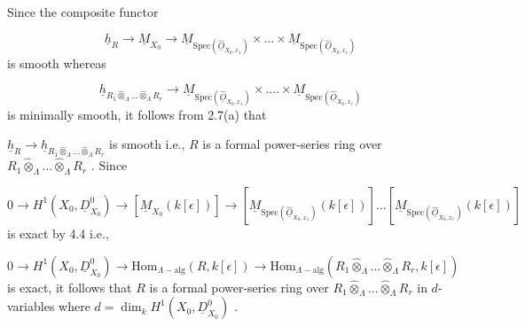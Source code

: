 \begin{center}
\end{center}
Since the composite functor

\begin{equation*}
\underline{h}_R \to \underline{M}_{X_0} \to \underline{M}_{\mathrm{Spec}(\widehat{\underline{O}}_{X_0,x_1})} \times ... \times \underline{M}_{\mathrm{Spec}(\widehat{\underline{O}}_{X_0,x_r})}
\end{equation*}
is smooth whereas

\begin{equation*}
\underline{h}_{R_1 \widehat{\otimes}_\Lambda ... \widehat{\otimes}_\Lambda R_r} \to \underline{M}_{\mathrm{Spec}(\widehat{\underline{O}}_{X_0,x_1})} \times .... \times \underline{M}_{\mathrm{Spec}(\widehat{\underline{O}}_{X_0,x_r})}
\end{equation*}
is minimally smooth, it follows from 2.7(a) that

$\underline{h}_R \to \underline{h}_{R_1 \widehat{\otimes}_\Lambda ... \widehat{\otimes}_\Lambda R_r}$   is smooth i.e.,  $R$  is a formal power-series ring over  $R_1 \widehat{\otimes}_\Lambda ... \widehat{\otimes}_\Lambda R_r$ . Since

\begin{equation*}
0 \to H^1(X_0,\underline{D}^0_{X_0}) \to [\underline{M}_{X_0}(k[\epsilon])] \to [\underline{M}_{\mathrm{Spec}(\widehat{\underline{O}}_{X_0,x_1})}(k[\epsilon])] ... [\underline{M}_{\mathrm{Spec}(\widehat{\underline{O}}_{X_0,x_r})}(k[\epsilon])]
\end{equation*}
is exact by 4.4 i.e.,

\begin{equation*}
0 \to H^1(X_0, \underline{D}^0_{X_0}) \to \mathrm{Hom}_{\Lambda-\mathrm{alg}}(R, k[\epsilon]) \to \mathrm{Hom}_{\Lambda-\mathrm{alg}}(R_1 \widehat{\otimes}_\Lambda ... \widehat{\otimes}_\Lambda R_r, k[\epsilon])
\end{equation*}
is exact, it follows that  $R$  is a formal power-series ring over    $R_1 \widehat{\otimes}_\Lambda ... \widehat{\otimes}_\Lambda R_r$ in $d$-variables where  $d = \dim_k H^1(X_0, \underline{D}^0_{X_0})$  .

